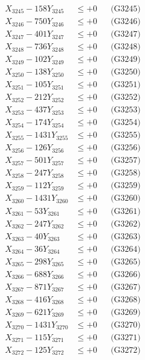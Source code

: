 \documentclass[a4paper,10pt]{article}
\begin{document}
{\begin{align}
X_{3245} - 158Y_{3245} &\leq +0 && \text{(G3245)} \\
X_{3246} - 750Y_{3246} &\leq +0 && \text{(G3246)} \\
X_{3247} - 401Y_{3247} &\leq +0 && \text{(G3247)} \\
X_{3248} - 736Y_{3248} &\leq +0 && \text{(G3248)} \\
X_{3249} - 102Y_{3249} &\leq +0 && \text{(G3249)} \\
X_{3250} - 138Y_{3250} &\leq +0 && \text{(G3250)} \\
\allowbreak
X_{3251} - 105Y_{3251} &\leq +0 && \text{(G3251)} \\
X_{3252} - 212Y_{3252} &\leq +0 && \text{(G3252)} \\
X_{3253} - 437Y_{3253} &\leq +0 && \text{(G3253)} \\
X_{3254} - 174Y_{3254} &\leq +0 && \text{(G3254)} \\
X_{3255} - 1431Y_{3255} &\leq +0 && \text{(G3255)} \\
X_{3256} - 126Y_{3256} &\leq +0 && \text{(G3256)} \\
X_{3257} - 501Y_{3257} &\leq +0 && \text{(G3257)} \\
X_{3258} - 247Y_{3258} &\leq +0 && \text{(G3258)} \\
X_{3259} - 112Y_{3259} &\leq +0 && \text{(G3259)} \\
X_{3260} - 1431Y_{3260} &\leq +0 && \text{(G3260)} \\
\allowbreak
X_{3261} - 53Y_{3261} &\leq +0 && \text{(G3261)} \\
X_{3262} - 247Y_{3262} &\leq +0 && \text{(G3262)} \\
X_{3263} - 40Y_{3263} &\leq +0 && \text{(G3263)} \\
X_{3264} - 36Y_{3264} &\leq +0 && \text{(G3264)} \\
X_{3265} - 298Y_{3265} &\leq +0 && \text{(G3265)} \\
X_{3266} - 688Y_{3266} &\leq +0 && \text{(G3266)} \\
X_{3267} - 871Y_{3267} &\leq +0 && \text{(G3267)} \\
X_{3268} - 416Y_{3268} &\leq +0 && \text{(G3268)} \\
X_{3269} - 621Y_{3269} &\leq +0 && \text{(G3269)} \\
X_{3270} - 1431Y_{3270} &\leq +0 && \text{(G3270)} \\
\allowbreak
X_{3271} - 115Y_{3271} &\leq +0 && \text{(G3271)} \\
X_{3272} - 125Y_{3272} &\leq +0 && \text{(G3272)} \\

\end{align}}
\end{document}
